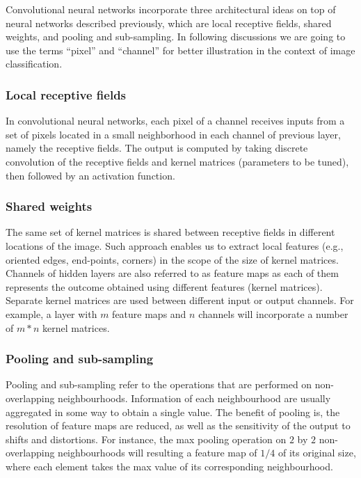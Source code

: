 Convolutional neural networks incorporate three architectural ideas on top of neural networks described previously, which are local receptive fields, shared weights, and pooling and sub-sampling. In following discussions we are going to use the terms ``pixel'' and ``channel'' for better illustration in the context of image classification.

\subsubsection{Local receptive fields}
\label{sec:Local receptive fields}
In convolutional neural networks, each pixel of a channel receives inputs from a set of pixels located in a small neighborhood in each channel of previous layer, namely the receptive fields. The output is computed by taking discrete convolution of the receptive fields and kernel matrices (parameters to be tuned), then followed by an activation function. 

\subsubsection{Shared weights}
\label{sec:Shared weights}
The same set of kernel matrices is shared between receptive fields in different locations of the image. Such approach enables us to extract local features (e.g., oriented edges, end-points, corners) in the scope of the size of kernel matrices. Channels of hidden layers are also referred to as feature maps as each of them represents the outcome obtained using different features (kernel matrices). Separate kernel matrices are used between different input or output channels. For example, a layer with $m$ feature maps and $n$ channels will incorporate a number of $m*n$ kernel matrices.

\subsubsection{Pooling and sub-sampling}
\label{sec:Pooling and sub-sampling}
Pooling and sub-sampling refer to the operations that are performed on non-overlapping neighbourhoods. Information of each neighbourhood are usually aggregated in some way to obtain a single value. The benefit of pooling is, the resolution of feature maps are reduced, as well as the sensitivity of the output to shifts and distortions. For instance, the max pooling operation on $2$ by $2$ non-overlapping neighbourhoods will resulting a feature map of $1/4$ of its original size, where each element takes the max value of its corresponding neighbourhood.

